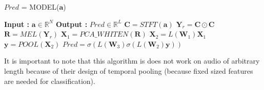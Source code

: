 \begin{algorithm}
  \caption{$Pred$ = MODEL($\textbf{a}$) }\label{Temporal Pooling}
  \begin{algorithmic}[1]
    \Statex \textbf{Input :} $\textbf{a} \in \mathbb{R}^{N}$
    \Statex \textbf{Output :} $Pred \in \mathbb{R}^{L}$ 
    \State $\textbf{C} = STFT(\textbf{a})$ 
    \State $\textbf{Y}_{r} = \textbf{C} \odot \textbf{C}$ 
    \State $\textbf{R} = MEL(\textbf{Y}_{r})$ 
    \State $\textbf{X}_{1} = PCA\_WHITEN(\textbf{R})$ 
    \State $\textbf{X}_{2} = L(\textbf{W}_{1})\textbf{X}_{1}$  
    \State $\textbf{y} = POOL(\textbf{X}_{2})$ 
    \State $Pred = \sigma(L(\textbf{W}_{3})\sigma(L(\textbf{W}_{2})\textbf{y}))$ 
  \end{algorithmic}
\end{algorithm}
\FloatBarrier
\noindent It is important to note that this algorithm is does not work on audio of arbitrary length because of their design of temporal pooling (because fixed sized features are needed for classification).
\bigskip

